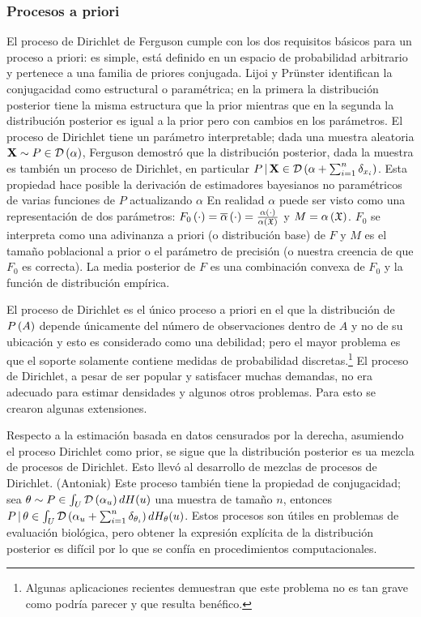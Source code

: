 \subsubsection{Procesos a priori}

El proceso de Dirichlet de Ferguson cumple con los dos requisitos básicos para un proceso a priori: es simple, está definido en %
un espacio de probabilidad arbitrario y pertenece a una familia de priores conjugada. Lijoi y Prünster identifican la %
conjugacidad como estructural o paramétrica; en la primera la distribución posterior tiene la misma estructura que la prior %
mientras que en la segunda la distribución posterior es igual a la prior pero con cambios en los parámetros. El proceso de %
Dirichlet tiene un parámetro interpretable; dada una muestra aleatoria $\mathbf{X} \sim P \in \mathcal{D}\left( \alpha \right)$, Ferguson demostró %
que la distribución posterior, dada la muestra es también un proceso de Dirichlet, en particular $P \,|\,\mathbf{X} \in \D%
\Pp{\alpha + \sum_{i = 1}^{n} \delta_{x_{i}}}$. Esta propiedad hace posible la derivación de estimadores bayesianos no paramétricos %
de varias funciones de $P$ actualizando $\alpha$ En realidad $\alpha$ puede ser visto como una representación de dos parámetros: %
$F_{0}\left( \cdot \right) = \overline{\alpha}\left( \cdot \right) = \frac{\alpha\left( \cdot \right)}{\alpha\left( \mathfrak{X} \right)}$ y $M = \alpha\left( \mathfrak{X} \right)$. $F_{0}$ se %
interpreta como una adivinanza a priori (o distribución base) de $F$ y $M$ es el tamaño poblacional a prior o el parámetro de %
precisión (o nuestra creencia de que $F_{0}$ es correcta). La media posterior de $F$ es una combinación convexa de $F_{0}$ y la %
función de distribución empírica. 

El proceso de Dirichlet es el único proceso a priori en el que la distribución de $P\left( A \right)$ depende únicamente del número de %
observaciones dentro de $A$ y no de su ubicación y esto es considerado como una debilidad; pero el mayor problema es que el %
soporte solamente contiene medidas de probabilidad discretas.\footnote{Algunas aplicaciones recientes demuestran que este problema %
no es tan grave como podría parecer y que resulta benéfico.} El proceso de Dirichlet, a pesar de ser popular y satisfacer muchas %
demandas, no era adecuado para estimar densidades y algunos otros problemas. Para esto se crearon algunas extensiones. 

Respecto a la estimación basada en datos censurados por la derecha, asumiendo el proceso Dirichlet como prior, se sigue que %
la distribución posterior es ua mezcla de procesos de Dirichlet. Esto llevó al desarrollo de mezclas de procesos de Dirichlet. %
(Antoniak) Este proceso también tiene la propiedad de conjugacidad; sea $\mathbf{\theta} \sim P \in \int_{U} \D\Pp{\alpha_{u}} %
dH(u)$ una muestra de tamaño $n$, entonces $P \,|\, \mathbf{\theta} \in \int_{U} \D\Pp{\alpha_{u} + \sum_{i = 1}^{n} %
\delta_{\theta_{i}}} dH_{\mathbf{\theta}}(u)$. Estos procesos son útiles en problemas de evaluación biológica, pero obtener %
la expresión explícita de la distribución posterior es difícil por lo que se confía en procedimientos computacionales.

